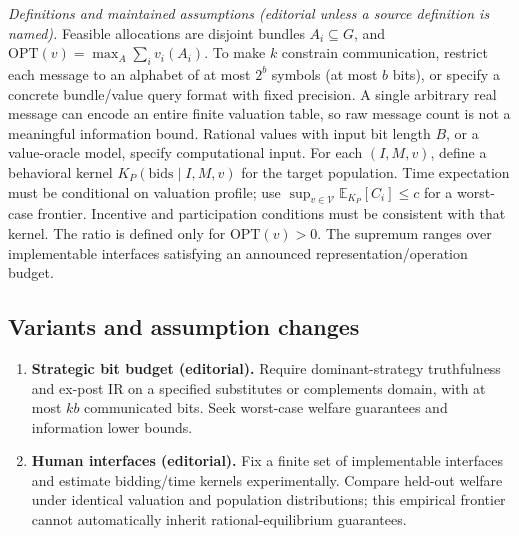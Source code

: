 \documentclass[11pt,a4paper]{article}
\begin{document}
\emph{Definitions and maintained assumptions (editorial unless a source definition is named).} Feasible allocations are disjoint bundles \(A_i\subseteq G\), and \(\mathrm{OPT}(v)=\max_A\sum_i v_i(A_i)\). To make \(k\) constrain communication, restrict each message to an alphabet of at most \(2^b\) symbols (at most \(b\) bits), or specify a concrete bundle/value query format with fixed precision. A single arbitrary real message can encode an entire finite valuation table, so raw message count is not a meaningful information bound. Rational values with input bit length \(B\), or a value-oracle model, specify computational input. For each \((I,M,v)\), define a behavioral kernel \(K_P(\text{bids}\mid I,M,v)\) for the target population. Time expectation must be conditional on valuation profile; use \(\sup_{v\in\mathcal V}\mathbb E_{K_P}[C_i]\le c\) for a worst-case frontier. Incentive and participation conditions must be consistent with that kernel. The ratio is defined only for \(\mathrm{OPT}(v)>0\). The supremum ranges over implementable interfaces satisfying an announced representation/operation budget.
\subsection*{Variants and assumption changes}
\begin{enumerate}
\item \textbf{Strategic bit budget (editorial).} Require dominant-strategy truthfulness and ex-post IR on a specified substitutes or complements domain, with at most \(kb\) communicated bits. Seek worst-case welfare guarantees and information lower bounds.
\item \textbf{Human interfaces (editorial).} Fix a finite set of implementable interfaces and estimate bidding/time kernels experimentally. Compare held-out welfare under identical valuation and population distributions; this empirical frontier cannot automatically inherit rational-equilibrium guarantees.
\end{enumerate}
\end{document}
